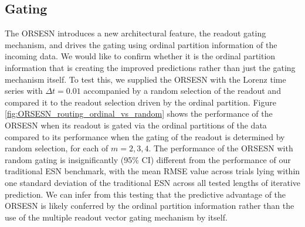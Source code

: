 \subsection{Gating}


The ORSESN introduces a new architectural feature, the readout gating mechanism, and drives the gating using ordinal partition information of the incoming data. We would like to confirm whether it is the ordinal partition information that is creating the improved predictions rather than just the gating mechanism itself. To test this, we supplied the ORSESN with the Lorenz time series with $\Delta t=0.01$ accompanied by a random selection of the readout and compared it to the readout selection driven by the ordinal partition. Figure \ref{fig:ORSESN_routing_ordinal_vs_random} shows the performance of the ORSESN when its readout is gated via the ordinal partitions of the data compared to its performance when the gating of the readout is determined by random selection, for each of $m=2,3,4$. The performance of the ORSESN with random gating is insignificantly (95\% CI) different from the performance of our traditional ESN benchmark, with the mean RMSE value across trials lying within one standard deviation of the traditional ESN across all tested lengths of iterative prediction. We can infer from this testing that the predictive advantage of the ORSESN is likely conferred by the ordinal partition information rather than the use of the multiple readout vector gating mechanism by itself.


